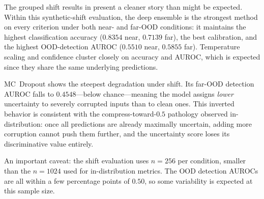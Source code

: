 \begin{table}[H]
    \centering
    \caption{Grouped shift results. Near-OOD is the mean over severity 1 and 3 conditions; far-OOD is severity 5. OOD detection AUROC separates shifted from clean samples using uncertainty scores. Evaluated on $n=256$ per condition.}
    \label{tab:shift_results}
\end{table}


The grouped shift results in  present a cleaner story than might be expected. Within this synthetic-shift evaluation, the deep ensemble is the strongest method on every criterion under both near- and far-OOD conditions: it maintains the highest classification accuracy ($0.8354$ near, $0.7139$ far), the best calibration, and the highest OOD-detection AUROC ($0.5510$ near, $0.5855$ far). Temperature scaling and confidence cluster closely on accuracy and AUROC, which is expected since they share the same underlying predictions.

MC~Dropout shows the steepest degradation under shift. Its far-OOD detection AUROC falls to $0.4548$---below chance---meaning the model assigns \emph{lower} uncertainty to severely corrupted inputs than to clean ones. This inverted behavior is consistent with the compress-toward-$0.5$ pathology observed in-distribution: once all predictions are already maximally uncertain, adding more corruption cannot push them further, and the uncertainty score loses its discriminative value entirely.

An important caveat: the shift evaluation uses $n=256$ per condition, smaller than the $n=1024$ used for in-distribution metrics. The OOD detection AUROCs are all within a few percentage points of $0.50$, so some variability is expected at this sample size.

